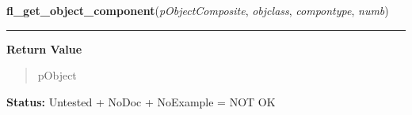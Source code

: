     \label{xformslib:library:fl_get_object_component}

    \vspace{0.5ex}

\hspace{.8\funcindent}\begin{boxedminipage}{\funcwidth}

    \raggedright \textbf{fl\_get\_object\_component}(\textit{pObjectComposite}, \textit{objclass}, \textit{compontype}, \textit{numb})

    \vspace{-1.5ex}

    \rule{\textwidth}{0.5\fboxrule}
\setlength{\parskip}{2ex}
\setlength{\parskip}{1ex}
      \textbf{Return Value}
    \vspace{-1ex}

      \begin{quote}
      pObject

      \end{quote}

\textbf{Status:} Untested + NoDoc + NoExample = NOT OK



    \end{boxedminipage}

    \label{xformslib:library:fl_for_all_objects}

    \vspace{0.5ex}

